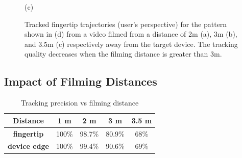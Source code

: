 \begin{figure}[!ht]
{\begin{minipage}[b]{4cm}
                \centering \footnotesize (c)
                \end{minipage}
            }
            \hspace{-0.1cm}
                \vspace{-3mm}
            \caption{Tracked fingertip trajectories (user's perspective) for the pattern shown in (d) from a video filmed from a distance of 2m (a), 3m (b), and 3.5m (c) respectively away from the target device. The tracking quality decreases when the filming distance is greater than 3m. }
            \vspace{-3mm}
            \label{fig:distance-show}
        \end{figure}



    \subsection{Impact of Filming Distances \label{sec:distances}}
        \begin{table}[!t]
            \centering
            \caption{Tracking precision vs filming distance}
            \vspace{-0.2mm}
            \label{tab:tab1}
            \small
            \begin{tabular}{ccccc}
                \toprule
                \textbf{Distance}& 1 m & 2 m & 3 m & 3.5 m \\
                \midrule
                \textbf{fingertip}  & 100\% & 98.7\% & 80.9\% & 68\% \\
                \textbf{device edge} & 100\% & 99.4\% & 90.6\% & 69\% \\
                \bottomrule
            \end{tabular}
            \vspace{-5mm}
        \end{table}


